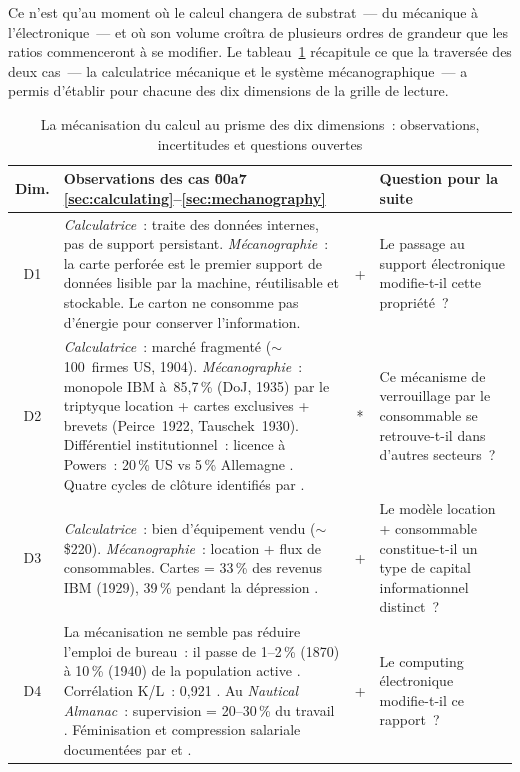 Ce n'est qu'au moment où le calcul changera de substrat~--- du mécanique à l'électronique~--- et où son volume croîtra de plusieurs ordres de grandeur que les ratios commenceront à se modifier. Le tableau~\ref{tab:compute-dimensions} récapitule ce que la traversée des deux cas~--- la calculatrice mécanique et le système mécanographique~--- a permis d'établir pour chacune des dix dimensions de la grille de lecture.

\begin{table}[p]
\caption{La mécanisation du calcul au prisme des dix dimensions~: observations, incertitudes et questions ouvertes}\label{tab:compute-dimensions}
\centering\footnotesize
\renewcommand{\arraystretch}{1.15}
\begin{tabularx}{\textwidth}{@{}cXcp{4.5cm}@{}}
\toprule
\textbf{Dim.} & \textbf{Observations des cas \u00a7\,\ref{sec:calculating}--\ref{sec:mechanography}} & & \textbf{Question pour la suite} \\
\midrule
D1 & \emph{Calculatrice}~: traite des données internes, pas de support persistant. \emph{Mécanographie}~: la carte perforée est le premier support de données lisible par la machine, réutilisable et stockable. Le carton ne consomme pas d'énergie pour conserver l'information. & + & Le passage au support électronique modifie-t-il cette propriété~? \\[3pt]
D2 & \emph{Calculatrice}~: marché fragmenté ($\sim$100~firmes US, 1904). \emph{Mécanographie}~: monopole IBM à~85,7\,\% (DoJ, 1935) par le triptyque location + cartes exclusives + brevets (Peirce~1922, Tauschek~1930). Différentiel institutionnel~: licence à Powers~: 20\,\% US vs 5\,\% Allemagne \parencite{heide_punched_2009}. Quatre cycles de clôture identifiés par \textcite{mounier-kuhn_punched_2015}. & * & Ce mécanisme de verrouillage par le consommable se retrouve-t-il dans d'autres secteurs~? \\[3pt]
D3 & \emph{Calculatrice}~: bien d'équipement vendu ($\sim$\$220). \emph{Mécanographie}~: location + flux de consommables. Cartes = 33\,\% des revenus IBM (1929), 39\,\% pendant la dépression \parencite{cortada_before_1993}. & + & Le modèle location + consommable constitue-t-il un type de capital informationnel distinct~? \\[3pt]
D4 & La mécanisation ne semble pas réduire l'emploi de bureau~: il passe de 1--2\,\% (1870) à 10\,\% (1940) de la population active \parencite{cortada_before_1993}. Corrélation K/L~: 0,921 \parencite{reinstaller_market_2001}. Au \emph{Nautical Almanac}~: supervision = 20--30\,\% du travail \parencite{daston_calculation_2018}. Féminisation et compression salariale documentées par \textcite{davies_womans_1982} et \textcite{strom_beyond_1992}. & + & Le computing électronique modifie-t-il ce rapport~? \\[3pt]

\end{tabularx}
\end{table}
